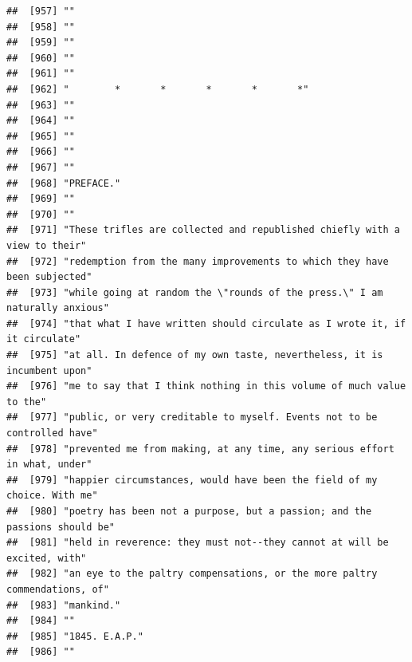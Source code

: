 \documentclass{article}\usepackage[]{graphicx}\usepackage[]{color}
\makeatletter
\newenvironment{kframe}{%
 \def\at@end@of@kframe{}%
 \ifinner\ifhmode%
  \def\at@end@of@kframe{\end{minipage}}%
  \begin{minipage}{\columnwidth}%
 \fi\fi%
 \def\FrameCommand##1{\hskip\@totalleftmargin \hskip-\fboxsep
 \colorbox{shadecolor}{##1}\hskip-\fboxsep
     \hskip-\linewidth \hskip-\@totalleftmargin \hskip\columnwidth}%
 \MakeFramed {\advance\hsize-\width
   \@totalleftmargin\z@ \linewidth\hsize
   \@setminipage}}%
 {\par\unskip\endMakeFramed%
 \at@end@of@kframe}
\newenvironment{knitrout}{}{} %
\makeatother
\begin{document}
\begin{knitrout}
\begin{kframe}
\begin{verbatim}
##  [957] ""                                                                            
##  [958] ""                                                                            
##  [959] ""                                                                            
##  [960] ""                                                                            
##  [961] ""                                                                            
##  [962] "        *       *       *       *       *"                                   
##  [963] ""                                                                            
##  [964] ""                                                                            
##  [965] ""                                                                            
##  [966] ""                                                                            
##  [967] ""                                                                            
##  [968] "PREFACE."                                                                    
##  [969] ""                                                                            
##  [970] ""                                                                            
##  [971] "These trifles are collected and republished chiefly with a view to their"    
##  [972] "redemption from the many improvements to which they have been subjected"     
##  [973] "while going at random the \"rounds of the press.\" I am naturally anxious"   
##  [974] "that what I have written should circulate as I wrote it, if it circulate"    
##  [975] "at all. In defence of my own taste, nevertheless, it is incumbent upon"      
##  [976] "me to say that I think nothing in this volume of much value to the"          
##  [977] "public, or very creditable to myself. Events not to be controlled have"      
##  [978] "prevented me from making, at any time, any serious effort in what, under"    
##  [979] "happier circumstances, would have been the field of my choice. With me"      
##  [980] "poetry has been not a purpose, but a passion; and the passions should be"    
##  [981] "held in reverence: they must not--they cannot at will be excited, with"      
##  [982] "an eye to the paltry compensations, or the more paltry commendations, of"    
##  [983] "mankind."                                                                    
##  [984] ""                                                                            
##  [985] "1845. E.A.P."                                                                
##  [986] ""                                                                            

\end{verbatim}
\end{kframe}
\end{knitrout}
\end{document}
